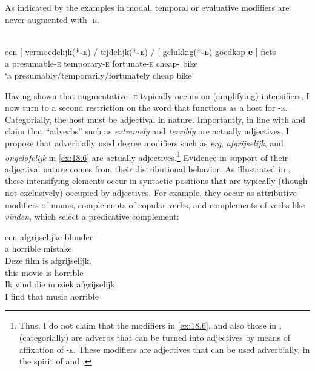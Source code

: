 \documentclass[output=paper]{langsci/langscibook}
\begin{document}
As indicated by the examples in  modal, temporal or evaluative
modifiers are never augmented with \textsc{-e}.

\ea%
    \label{ex:18.13}\\
    \gll een [ vermoedelijk(*\textbf{\textsc{-e}})  /  tijdelijk(*\textbf{\textsc{-e}})    /  [ gelukkig(*\textbf{\textsc{-e}})    goedkop-\textbf{e} ] fiets\\
    a  {}    presumable-\textsc{e}  {}  temporary-\textsc{e} {} {} fortunate-\textsc{e}  cheap-\Agr{} {} bike\\
    \glt \enquote*{a presumably/temporarily/fortunately cheap bike}
\z

Having shown that augmentative -\textsc{e} typically occurs on (amplifying)
intensifiers, I now turn to a second restriction on the word that functions as
a host for \textsc{-e}. Categorially, the host must be adjectival in nature.
Importantly, in line with  and  claim
that  \enquote{adverbs} such as \emph{extremely} and \emph{terribly} are
actually adjectives, I propose that adverbially used degree modifiers such as
\emph{erg}, \emph{afgrijselijk}, and \emph{ongelofelijk} in \eqref{ex:18.6} are
actually adjectives.\footnote{Thus, I do not claim that the modifiers in
\eqref{ex:18.6}, and also those in , (categorially) are adverbs
that can be turned into adjectives by means of affixation of \textsc{-e}. These
modifiers are adjectives that can be used adverbially, in the spirit of
\citet{Bowers1975} and \citet{Emonds1976}.} Evidence in support of their
adjectival nature comes from their distributional behavior. As illustrated in
, these intensifying elements occur in syntactic positions that
are typically (though not exclusively) occupied by adjectives. For example,
they occur as attributive modifiers of nouns, complements of copular
verbs, and
complements of verbs like \emph{vinden}, which  select a predicative
complement:

\ea%
    \label{ex:18.14}
	\ea
	\gll  een    afgrijselijke  blunder\\
		 a        horrible          mistake\\
	\ex
	\gll  Deze    film      is    afgrijselijk.\\
		this      movie  is    horrible\\
	\ex
	\gll Ik    vind    die    muziek    afgrijselijk.\\
		  I      find    that  music    horrible\\
	\z
\z
\end{document}
